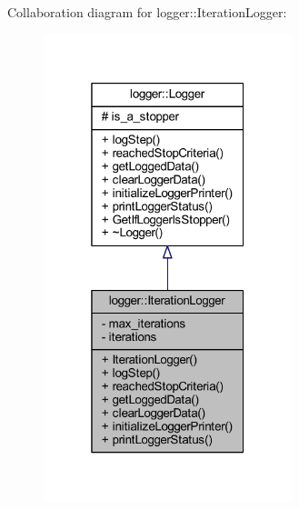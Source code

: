Collaboration diagram for logger\+:\+:Iteration\+Logger\+:
\nopagebreak
\begin{figure}[H]
\begin{center}
\leavevmode
\includegraphics[width=205pt]{classlogger_1_1_iteration_logger__coll__graph}
\end{center}
\end{figure}
